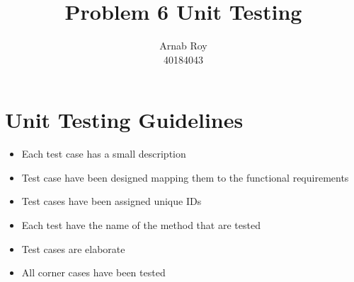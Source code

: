 \documentclass[a4paper,12pt]{article}
\title{Problem 6 Unit Testing}
\author{Arnab Roy \\ 40184043}
\date{}
\begin{document}
\maketitle
\section{Unit Testing Guidelines}

\begin{itemize}
    \item Each test case has a small description
    \item Test case have been designed mapping them to the functional requirements
    \item Test cases have been assigned unique IDs
    \item Each test have the name of the method that are tested
    \item Test cases are elaborate
    \item All corner cases have been tested
\end{itemize}
\end{document}
